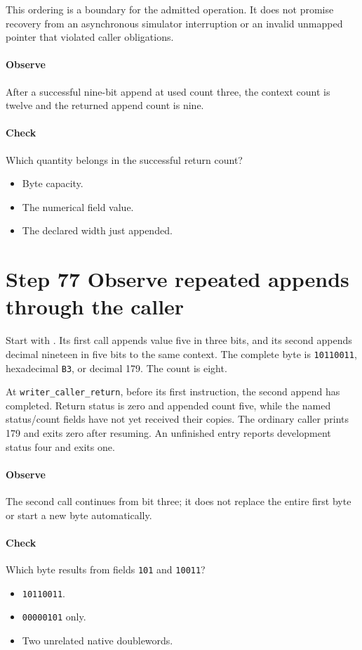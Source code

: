 This ordering is a boundary for the admitted operation. It does not promise
recovery from an asynchronous simulator interruption or an invalid unmapped
pointer that violated caller obligations.

\paragraph{Observe} After a successful nine-bit append at used count three,
the context count is twelve and the returned append count is nine.
\paragraph{Check} Which quantity belongs in the successful return count?
\begin{itemize}
  \item[A.] Byte capacity.
  \item[B.] The numerical field value.
  \item[C.] The declared width just appended.
\end{itemize}

\section{Step 77 Observe repeated appends through the caller}\label{h263-writer-s07}
Start with . Its first call
appends value five in three bits, and its second appends decimal nineteen in five
bits to the same context. The complete byte is \texttt{10110011}, hexadecimal
\texttt{B3}, or decimal 179. The count is eight.

At \texttt{writer\_caller\_return}, before its first instruction, the second
append has completed. Return status is zero and appended count five, while the
named status/count fields have not yet received their copies. The ordinary caller
prints 179 and exits zero after resuming. An unfinished entry reports development
status four and exits one.

\paragraph{Observe} The second call continues from bit three; it does not
replace the entire first byte or start a new byte automatically.
\paragraph{Check} Which byte results from fields \texttt{101} and \texttt{10011}?
\begin{itemize}
  \item[A.] \texttt{10110011}.
  \item[B.] \texttt{00000101} only.
  \item[C.] Two unrelated native doublewords.
\end{itemize}

